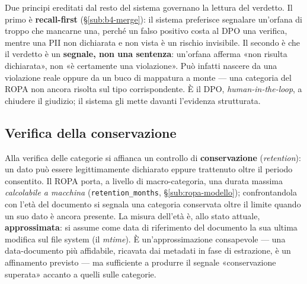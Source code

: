 Due principi ereditati dal resto del sistema governano la lettura del verdetto. Il primo è \textbf{recall-first} (§\ref{sub:b4-merge}): il sistema preferisce segnalare un'orfana di troppo che mancarne una, perché un falso positivo costa al DPO una verifica, mentre una PII non dichiarata e non vista è un rischio invisibile. Il secondo è che il verdetto è un \textbf{segnale, non una sentenza}: un'orfana afferma «non risulta dichiarata», non «è certamente una violazione». Può infatti nascere da una violazione reale oppure da un buco di mappatura a monte --- una categoria del ROPA non ancora risolta sul tipo corrispondente. È il DPO, \emph{human-in-the-loop}, a chiudere il giudizio; il sistema gli mette davanti l'evidenza strutturata.

\subsection{Verifica della conservazione}
\label{sub:b7-retention}

Alla verifica delle categorie si affianca un controllo di \textbf{conservazione} (\textit{retention}): un dato può essere legittimamente dichiarato eppure trattenuto oltre il periodo consentito. Il ROPA porta, a livello di macro-categoria, una durata massima \emph{calcolabile a macchina} (\texttt{retention\_months}, §\ref{sub:ropa-modello}); confrontandola con l'età del documento si segnala una categoria conservata oltre il limite quando un suo dato è ancora presente. La misura dell'età è, allo stato attuale, \textbf{approssimata}: si assume come data di riferimento del documento la sua ultima modifica sul file system (il \emph{mtime}). È un'approssimazione consapevole --- una data-documento più affidabile, ricavata dai metadati in fase di estrazione, è un affinamento previsto --- ma sufficiente a produrre il segnale «conservazione superata» accanto a quelli sulle categorie.
